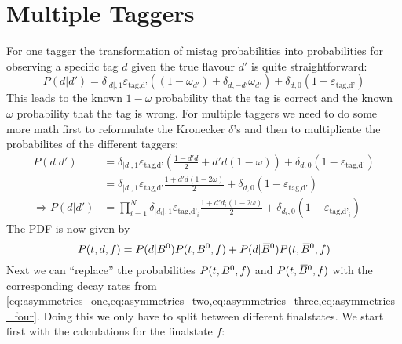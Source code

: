 \section{Multiple Taggers}

For one tagger the transformation of mistag probabilities into probabilities for observing a specific tag $d$ given the true flavour $d'$ is quite
straightforward:
\begin{equation*}
    P(d|d')=\delta_{\left|d\right|,1}\varepsilon_\text{tag,d'}\left((1-\omega_{d'})+\delta_{d,-d'}\omega_{d'}\right)
        +\delta_{d,0}\left(1-\varepsilon_\text{tag,d'}\right)
\end{equation*}
This leads to the known $1-\omega$ probability that the tag is correct and the known $\omega$ probability that the tag is wrong. For multiple taggers we
need to do some more math first to reformulate the Kronecker $\delta$'s and then to multiplicate the probabilites of the different taggers:
\begin{align*}
    P(d|d')&=\delta_{\left|d\right|,1}\varepsilon_\text{tag,d'}\left(\frac{1-d'd}{2}+d'd(1-\omega)\right)
        +\delta_{d,0}\left(1-\varepsilon_\text{tag,d'}\right)\\
    &=\delta_{\left|d\right|,1}\varepsilon_\text{tag,d'}\frac{1+d'd(1-2\omega)}{2}+\delta_{d,0}\left(1-\varepsilon_\text{tag,d'}\right)\\
    \Rightarrow P(d|d')&=\prod_{i=1}^{N}\delta_{\left|d_i\right|,1}\varepsilon_{\text{tag,d'}_{i}}\frac{1+d'd_i(1-2\omega)}{2}
        +\delta_{d_i,0}\left(1-\varepsilon_{\text{tag,d'}_i}\right)
\end{align*}
The PDF is now given by
\begin{equation*}
    P(t,d,f)=P(d|B^0)P(t,B^0,f)+P(d|\kern 0.18em\overline{\kern -0.18em B}{}^0)P(t,\kern 0.18em\overline{\kern -0.18em B}{}^0,f)
\end{equation*}
Next we can \enquote{replace} the probabilities $P(t,B^0,f)$ and $P(t,\kern 0.18em\overline{\kern -0.18em B}{}^0,f)$ with the corresponding decay rates from
\cref{eq:asymmetries_one,eq:asymmetries_two,eq:asymmetries_three,eq:asymmetries_four}. Doing this we only have to split between different
finalstates. We start first with the calculations for the finalstate $f$:
